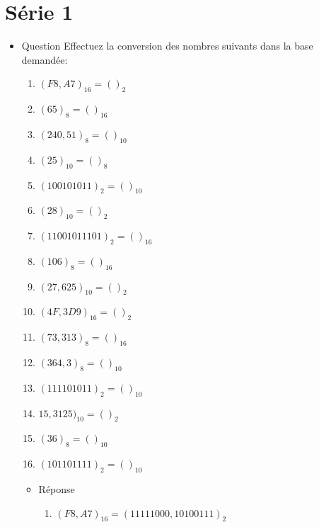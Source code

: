 \documentclass[letter, oneside]{book}
\begin{document}
\section*{Série 1}
\label{sec:org87f2c86}
\begin{itemize}
\item Question
\label{sec:org36cd67a}
Effectuez la conversion des nombres suivants dans la base demandée:

\begin{enumerate}
\item \((F8,A7)_{16} = ( )_{2}\)

\item \((65)_{8} = ( )_{16}\)

\item \((240,51)_{8} = ( )_{10}\)

\item \((25)_{10} = ( )_{8}\)

\item \((100101011)_{2} = ( )_{10}\)

\item \((28)_{10} = ( )_{2}\)

\item \((11001011101)_{2} = ( )_{16}\)

\item \((106)_{8} = ( )_{16}\)

\item \((27,625)_{10} = ( )_{2}\)

\item \((4F,3D9)_{16} = ( )_{2}\)

\item \((73,313)_{8} = ( )_{16}\)

\item \((364,3)_{8} = ( )_{10}\)

\item \((111101011)_{2} = ( )_{10}\)

\item \(15,3125)_{10} = ( )_{2}\)

\item \((36)_{8} = ( )_{10}\)

\item \((101101111)_{2} = ( )_{10}\)
\end{enumerate}

\begin{itemize}
\item Réponse
\label{sec:orgb372195}
\begin{enumerate}
\item \((F8,A7)_{16} = (11111000,10100111)_{2}\)


\end{enumerate}
\end{itemize}
\end{itemize}
\end{document}
